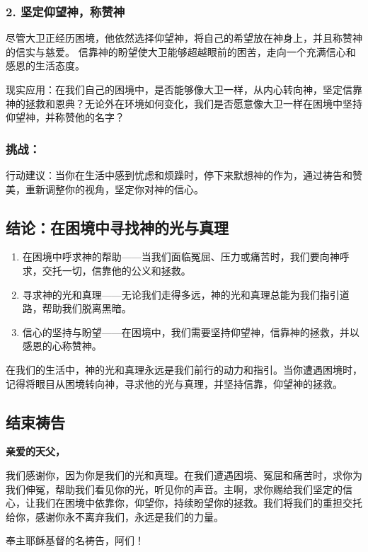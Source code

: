 \documentclass[a4paper, 12pt]{article}
\begin{document}
\subsubsection*{2. 坚定仰望神，称赞神}
\hspace{0.6cm}尽管大卫正经历困境，他依然选择仰望神，将自己的希望放在神身上，并且称赞神的信实与慈爱。
信靠神的盼望使大卫能够超越眼前的困苦，走向一个充满信心和感恩的生活态度。

现实应用：在我们自己的困境中，是否能够像大卫一样，从内心转向神，坚定信靠神的拯救和恩典？无论外在环境如何变化，我们是否愿意像大卫一样在困境中坚持仰望神，并称赞他的名字？
\subsubsection*{挑战：}

行动建议：当你在生活中感到忧虑和烦躁时，停下来默想神的作为，通过祷告和赞美，重新调整你的视角，坚定你对神的信心。
\subsection*{结论：在困境中寻找神的光与真理}
\begin{enumerate}
    \item 在困境中呼求神的帮助——当我们面临冤屈、压力或痛苦时，我们要向神呼求，交托一切，信靠他的公义和拯救。

    \item 寻求神的光和真理——无论我们走得多远，神的光和真理总能为我们指引道路，帮助我们脱离黑暗。

    \item 信心的坚持与盼望——在困境中，我们需要坚持仰望神，信靠神的拯救，并以感恩的心称赞神。

\end{enumerate}

在我们的生活中，神的光和真理永远是我们前行的动力和指引。当你遭遇困境时，记得将眼目从困境转向神，寻求他的光与真理，并坚持信靠，仰望神的拯救。

\subsection*{结束祷告}
\textbf{亲爱的天父，}

我们感谢你，因为你是我们的光和真理。在我们遭遇困境、冤屈和痛苦时，求你为我们伸冤，帮助我们看见你的光，听见你的声音。主啊，求你赐给我们坚定的信心，让我们在困境中依靠你，仰望你，持续盼望你的拯救。我们将我们的重担交托给你，感谢你永不离弃我们，永远是我们的力量。

奉主耶稣基督的名祷告，阿们！
\newpage
\end{document}
